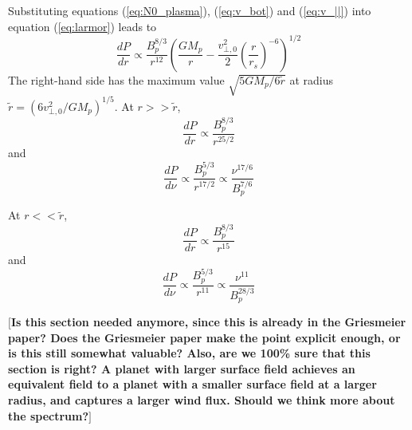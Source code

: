 \documentclass{emulateapj}
\def\memoDS#1{\color{blue}$[${\bf #1}$]$ \color{black}}
\begin{document}
Substituting equations (\ref{eq:N0_plasma}),  (\ref{eq:v_bot}) and (\ref{eq:v_||}) into equation (\ref{eq:larmor}) leads to
\begin{equation}
\frac{dP}{dr} \propto \frac{B_p^{8/3}}{r^{12}} \left( \frac{GM_p}{r} - \frac{v_{\bot ,0}^2}{2} \left( \frac{r}{r_s} \right)^{-6} \right)^{1/2}  
\end{equation}
The right-hand side has the maximum value $\sqrt{5GM_p/6\tilde r} $ at radius $\tilde r=(6v_{\bot ,0}^2/GM_p)^{1/5}$. 
At $r>>\tilde r$, 
\begin{equation}
\frac{dP}{dr} \propto \frac{B_p^{8/3}}{r^{25/2}}
\end{equation}
and
\begin{equation}
\frac{dP}{d\nu } \propto \frac{B_p^{5/3}}{r^{17/2}} \propto \frac{\nu^{17/6}}{B_p^{7/6}}
\end{equation}


At $r<<\tilde r$, 
\begin{equation}
\frac{dP}{dr} \propto \frac{B_p^{8/3}}{r^{15}}
\end{equation}
and
\begin{equation}
\frac{dP}{d\nu } \propto \frac{B_p^{5/3}}{r^{11}} \propto \frac{\nu^{11}}{B_p^{28/3}}
\end{equation}




\newpage







\memoDS{Is this section needed anymore, since this is already in the Griesmeier paper?
Does the Griesmeier paper make the point explicit enough, or is this still somewhat valuable?
Also, are we 100\% sure that this section is right?
A planet with larger surface field achieves an equivalent field to a planet with a smaller surface field at a larger radius, and captures a larger wind flux.
Should we think more about the spectrum?}
\end{document}
